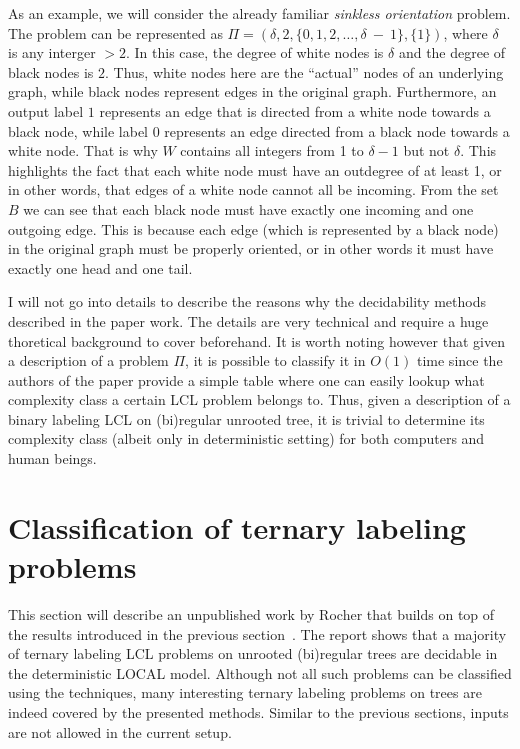 As an example, we will consider the already familiar \emph{sinkless orientation}
problem. The problem can be represented as $\Pi = (\delta, 2, \{0, 1, 2, \dots, \delta~-~1\}, \{ 1 \})$,
where $\delta$ is any interger $> 2$. In this case, the degree of white nodes is
$\delta$ and the degree of black nodes is $2$. Thus, white nodes here are the ``actual''
nodes of an underlying graph, while black nodes represent edges in the original graph.
Furthermore, an output label $1$ represents an edge
that is directed from a white node towards a black node, while label $0$ represents
an edge directed from a black node towards a white node. That is why
$W$ contains all integers from 1 to $\delta - 1$ but not $\delta$.
This highlights the fact that each white node must have an outdegree of at least 1,
or in other words, that edges of a white node cannot all be incoming.
From the set $B$ we can see that each black node must have 
exactly one incoming and one outgoing edge. This is because each edge (which is represented by a black node)
in the original graph must be properly oriented, or in other words it must
have exactly one head and one tail.

I will not go into details to describe the reasons why the decidability methods
described in the paper work. The details are very technical and require a huge
thoretical background to cover beforehand. It is worth noting however that
given a description of a problem $\Pi$, it is possible to classify it in $O(1)$
time since the authors of the paper provide a simple table where one can
easily lookup what complexity class a certain LCL problem belongs to. Thus,
given a description of a binary labeling LCL on (bi)regular unrooted tree,
it is trivial to determine its complexity class (albeit only in deterministic setting)
for both computers and human beings.

\section{Classification of ternary labeling problems}

This section will describe an unpublished work by Rocher that builds on top
of the results introduced in the previous section~\cite{Rocher2020doc, Rocher2020clas}.
The report shows that a majority of ternary labeling LCL problems on unrooted
(bi)regular trees are decidable in the deterministic LOCAL model. Although not all such problems
can be classified using the techniques, many interesting ternary labeling problems on trees
are indeed covered by the presented methods.
Similar to the previous sections, inputs are not allowed in the current setup.

